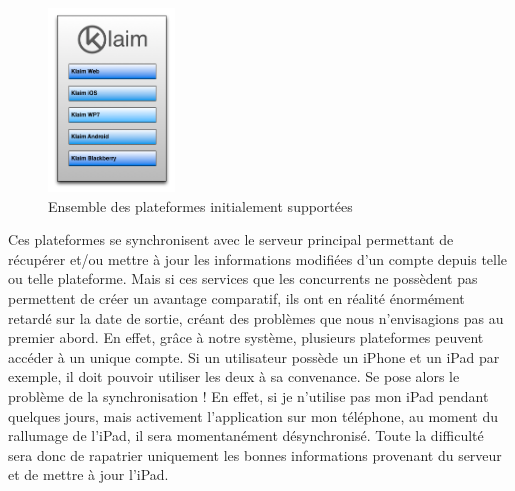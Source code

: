\documentclass{article}
\begin{document}
		\begin{figure}[H]
  		\begin{center}
			\includegraphics[width=0.3\textwidth]{Images/klaim.png}
  			\caption{Ensemble des plateformes initialement supportées}
  			\label{fig:animals}
		\end{center}
	\end{figure}


Ces plateformes se synchronisent avec le serveur principal permettant de récupérer et/ou mettre à jour les informations modifiées d’un compte depuis telle ou telle plateforme. Mais si ces services que les concurrents ne possèdent pas permettent de créer un avantage comparatif, ils ont en réalité énormément retardé sur la date de sortie, créant des problèmes que nous n’envisagions pas au premier abord. En effet, grâce à notre système, plusieurs plateformes peuvent accéder à un unique compte. Si un utilisateur possède un iPhone et un iPad par exemple, il doit pouvoir utiliser les deux à sa convenance.  Se pose alors le problème de la synchronisation ! En effet, si je n’utilise pas mon iPad pendant quelques jours, mais activement l’application sur mon téléphone,  au moment du rallumage de l’iPad, il sera momentanément désynchronisé. Toute la difficulté sera donc de rapatrier uniquement les bonnes informations provenant du serveur et de mettre à jour l’iPad.\\
\end{document}
